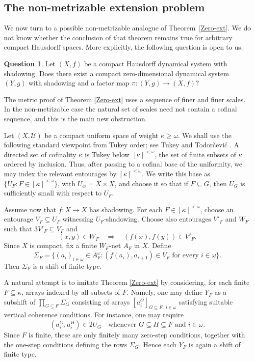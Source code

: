 \documentclass[12pt]{amsart}
\theoremstyle{definition}
\newtheorem{question}[theorem]{Question}
\numberwithin{equation}{section}
\theoremstyle{remark}
\def\U{{\mathcal{U}}}
\def\U{{\mathcal{U}}}
\begin{document}
\subsection{The non-metrizable extension problem}

We now turn to a possible non-metrizable analogue of
Theorem~\ref{Zero-ext}.
 We do not know whether the conclusion of that theorem
remains true for arbitrary compact Hausdorff spaces. More explicitly, the
following question is open to us.

\begin{question}\label{q:nonmetric_zero_ext}
Let $(X,f)$ be a compact Hausdorff dynamical system with shadowing. Does there
exist a compact zero-dimensional dynamical system $(Y,g)$ with shadowing and a
factor map $\pi:(Y,g)\to (X,f)$?
\end{question}

The metric proof of Theorem \ref{Zero-ext} uses a sequence of finer and finer
scales. In the non-metrizable case the natural set of scales need not contain a
cofinal sequence, and this is the main new obstruction.

Let $(X,\U)$ be a compact uniform space of weight
$\kappa\geq\omega$. We shall use the following standard viewpoint from Tukey
order; see Tukey \cite{Tukey} and
Todor\v{c}evi\'c \cite{Todorcevic}. A directed set of cofinality $\kappa$ is Tukey below
$[\kappa]^{<\omega}$, the set of finite subsets of $\kappa$ ordered by
inclusion. Thus, after passing to a cofinal base of the uniformity, we may index
the relevant entourages by $[\kappa]^{<\omega}$. We write this base as
$\{U_F:F\in[\kappa]^{<\omega}\}$, with $U_\varnothing=X\times X$, and choose it
so that if $F\subseteq G$, then $U_G$ is sufficiently small with respect to
$U_F$.

Assume now that $f:X\to X$ has shadowing. For each
$F\in[\kappa]^{<\omega}$, choose an entourage $V_F\subseteq U_F$ witnessing
$U_F$-shadowing. Choose also entourages $V'_F$ and $W_F$ such that
$3V'_F\subseteq V_F$ and
\[
    (x,y)\in W_F \quad\Longrightarrow\quad (f(x),f(y))\in V'_F.
\]
Since $X$ is compact, fix a finite $W_F$-net $A_F$ in $X$. Define
\[
    \Sigma_F=\{(a_i)_{i\in\omega}\in A_F^\omega:
    (f(a_i),a_{i+1})\in V_F\text{ for every }i\in\omega\}.
\]
Then $\Sigma_F$ is a shift of finite type.

A natural attempt is to imitate Theorem \ref{Zero-ext} by considering, for each
finite $F\subseteq\kappa$, arrays indexed by all subsets of $F$. Namely, one
may define $Y_F$ as a subshift of $\prod_{G\subseteq F}\Sigma_G$ consisting of
arrays $[a_i^G]_{G\subseteq F,\ i\in\omega}$ satisfying suitable vertical
coherence conditions. For instance, one may require
\[
    (a_i^G,a_i^H)\in 2U_G
    \quad\text{whenever }G\subseteq H\subseteq F\text{ and }i\in\omega.
\]
Since $F$ is finite, these are only finitely many zero-step conditions, together
with the one-step conditions defining the rows $\Sigma_G$. Hence each $Y_F$ is
again a shift of finite type.
\end{document}

